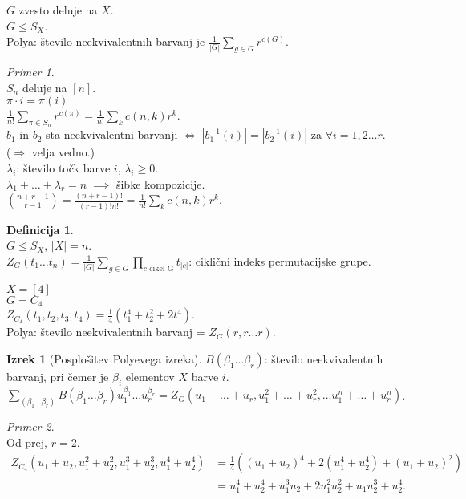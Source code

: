 \documentclass[a4paper, 12pt]{book}
\theoremstyle{definition}
\newtheorem{defn}[counter]{Definicija}
\newtheorem{theorem}[counter]{Izrek}
\theoremstyle{remark}
\newtheorem*{ex}{Primer}
\begin{document}
$G$ zvesto deluje na $X$. \\
$G \leq S_X$. \\
Polya: število neekvivalentnih barvanj je $\frac{1}{|G|} \sum_{g \in G} r^{c(G)}$.
\begin{ex} \text{} \\
  $S_n$ deluje na $[n]$. \\
  $\pi \cdot i = \pi(i)$ \\
  $\frac{1}{n!} \sum_{\pi \in S_n} r^{c(\pi)} = \frac{1}{n!} \sum_k c(n, k) r^k$. \\
  $b_1$ in $b_2$ sta neekvivalentni barvanji $\iff \; \left|b_1^{-1}(i)\right| = \left|b_2^{-1}(i)\right|$
  za $\forall i = 1, 2 \dots r$. \\
  ($\Rightarrow$ velja vedno.) \\
  $\lambda_i$: število točk barve $i$, $\lambda_i \geq 0$. \\
  $\lambda_1 + \dots + \lambda_r = n \; \implies$ šibke kompozicije. \\
  $\binom{n+r-1}{r-1} = \frac{(n+r-1)!}{(r-1)! n!} = \frac{1}{n!} \sum_k c(n, k) r^k$.
\end{ex}
\begin{defn} \text{} \\
  $G \leq S_X$, $|X| = n$. \\
  $Z_G(t_1 \dots t_n) = \frac{1}{|G|} \sum_{g \in G} \prod_{c \text{ cikel G}} t_{|c|}$:
  ciklični indeks permutacijske grupe.
\end{defn}
$X = [4]$ \\
$G = C_4$ \\
$Z_{C_4}(t_1, t_2, t_3, t_4) = \frac{1}{4} \left(t_1^4 + t_2^2 + 2 t^4\right)$. \\
Polya: število neekvivalentnih barvanj = $Z_G(r, r \dots r)$.
\begin{theorem}[Posplošitev Polyevega izreka]
  $B(\beta_1 \dots \beta_r)$: število neekvivalentnih barvanj, pri čemer je $\beta_i$ elementov $X$ barve $i$. \\
  $\sum_{(\beta_1 \dots \beta_r)} B(\beta_1 \dots \beta_r) u_1^{\beta_1} \dots u_r^{\beta_r}
  = Z_G(u_1 + \dots + u_r, u_1^2 + \dots + u_r^2, \dots u_1^n + \dots + u_r^n)$.
\end{theorem}
\begin{ex} \text{} \\
  Od prej, $r=2$.
  \begin{align*}
    Z_{C_4}(u_1 + u_2, u_1^2 + u_2^2, u_1^3 + u_2^3, u_1^4 + u_2^4)
    &= \frac{1}{4} \left((u_1+u_2)^4 + 2(u_1^4+u_2^4) + (u_1+u_2)^2\right) \\
    &= u_1^4 + u_2^4 + u_1^3 u_2 + 2 u_1^2 u_2^2 + u_1 u_2^3 + u_2^4.
  \end{align*}
\end{ex}
\end{document}
